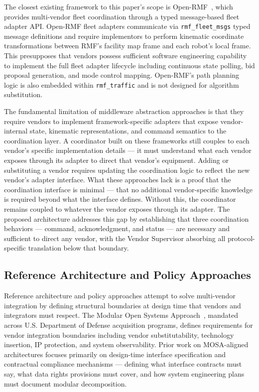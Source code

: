 \documentclass[a4paper,fleqn]{cas-dc}
\begin{document}
The closest existing framework to this paper's scope is Open-RMF~\cite{openrmf2021}, which provides multi-vendor fleet coordination through a typed message-based fleet adapter API. Open-RMF fleet adapters communicate via \texttt{rmf\_fleet\_msgs} typed message definitions and require implementors to perform kinematic coordinate transformations between RMF's facility map frame and each robot's local frame. This presupposes that vendors possess sufficient software engineering capability to implement the full fleet adapter lifecycle including continuous state polling, bid proposal generation, and mode control mapping. Open-RMF's path planning logic is also embedded within \texttt{rmf\_traffic} and is not designed for algorithm substitution.

The fundamental limitation of middleware abstraction approaches is that they require vendors to implement framework-specific adapters that expose vendor-internal state, kinematic representations, and command semantics to the coordination layer. A coordinator built on these frameworks still couples to each vendor's specific implementation details — it must understand what each vendor exposes through its adapter to direct that vendor's equipment. Adding or substituting a vendor requires updating the coordination logic to reflect the new vendor's adapter interface. What these approaches lack is a proof that the coordination interface is minimal — that no additional vendor-specific knowledge is required beyond what the interface defines. Without this, the coordinator remains coupled to whatever the vendor exposes through its adapter. The proposed architecture addresses this gap by establishing that three coordination behaviors — command, acknowledgment, and status — are necessary and sufficient to direct any vendor, with the Vendor Supervisor absorbing all protocol-specific translation below that boundary.

\subsection{Reference Architecture and Policy Approaches}

Reference architecture and policy approaches attempt to solve multi-vendor integration by defining structural boundaries at design time that vendors and integrators must respect. The Modular Open Systems Approach~\cite{dod2019mosa}, mandated across U.S. Department of Defense acquisition programs, defines requirements for vendor integration boundaries including vendor substitutability, technology insertion, IP protection, and system observability. Prior work on MOSA-aligned architectures focuses primarily on design-time interface specification and contractual compliance mechanisms — defining what interface contracts must say, what data rights provisions must cover, and how system engineering plans must document modular decomposition.
\end{document}
